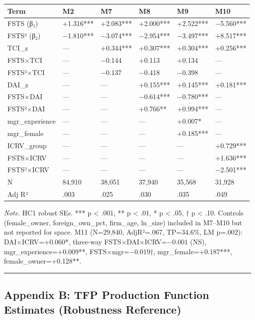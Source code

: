 \documentclass[12pt,a4paper]{article}
\begin{document}
\begin{longtable}[]{@{}llllll@{}}
\toprule\noalign{}
Term & M2 & M7 & M8 & M9 & M10 \\
\midrule\noalign{}
\endhead
\bottomrule\noalign{}
\endlastfoot
FSTS (β₁) & +1.316*** & +2.083*** & +2.000*** & +2.522*** & −5.560*** \\
FSTS² (β₂) & −1.810*** & −3.074*** & −2.954*** & −3.497*** &
+8.517*** \\
TCI\_z & --- & +0.344*** & +0.307*** & +0.304*** & +0.256*** \\
FSTS×TCI & --- & −0.144 & +0.113 & +0.134 & --- \\
FSTS²×TCI & --- & −0.137 & −0.418 & −0.398 & --- \\
DAI\_z & --- & --- & +0.155*** & +0.145*** & +0.181*** \\
FSTS×DAI & --- & --- & −0.614*** & −0.780*** & --- \\
FSTS²×DAI & --- & --- & +0.766** & +0.994*** & --- \\
mgr\_experience & --- & --- & --- & +0.007* & --- \\
mgr\_female & --- & --- & --- & +0.185*** & --- \\
ICRV\_group & --- & --- & --- & --- & +0.729*** \\
FSTS×ICRV & --- & --- & --- & --- & +1.636*** \\
FSTS²×ICRV & --- & --- & --- & --- & −2.501*** \\
N & 84,910 & 38,051 & 37,940 & 35,568 & 31,928 \\
Adj R² & .003 & .025 & .030 & .035 & .049 \\
\end{longtable}

\emph{Note.} HC1 robust SEs. *** p \textless{} .001, ** p \textless{}
.01, * p \textless{} .05, † p \textless{} .10. Controls (female\_owner,
foreign\_own\_pct, firm\_age, ln\_size) included in M7--M10 but not
reported for space. M11 (N=29,840, AdjR²=.067, TP=34.6\%, LM p=.002):
DAI×ICRV=+0.060*, three-way FSTS×DAI×ICRV=−0.001 (NS),
mgr\_experience=+0.009**, FSTS×mgr=−0.019†, mgr\_female=+0.187***,
female\_owner=+0.128**.

\begin{center}\rule{0.5\linewidth}{0.5pt}\end{center}

\hypertarget{appendix-b-tfp-production-function-estimates-robustness-reference}{%
\subsection{Appendix B: TFP Production Function Estimates (Robustness
Reference)}\label{appendix-b-tfp-production-function-estimates-robustness-reference}}
\end{document}
